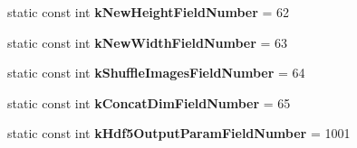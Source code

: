 \begin{DoxyCompactItemize}
\mbox{\label{classcaffe_1_1_v0_layer_parameter_a3b9cf98d26e1eacb3cabf23b320a76fe}} 
static const int {\bfseries k\+New\+Height\+Field\+Number} = 62
\item 
\mbox{\label{classcaffe_1_1_v0_layer_parameter_a8869c8ce79197145fe7b7d7c9a7cbb4d}} 
static const int {\bfseries k\+New\+Width\+Field\+Number} = 63
\item 
\mbox{\label{classcaffe_1_1_v0_layer_parameter_aa8a75a89d321d30abc38c60b6d050083}} 
static const int {\bfseries k\+Shuffle\+Images\+Field\+Number} = 64
\item 
\mbox{\label{classcaffe_1_1_v0_layer_parameter_ab67ae9676382ebfb408e5bc3bb166321}} 
static const int {\bfseries k\+Concat\+Dim\+Field\+Number} = 65
\item 
\mbox{\label{classcaffe_1_1_v0_layer_parameter_a3ba00a180e0d51e81b4f3b9a5b16b5d9}} 
static const int {\bfseries k\+Hdf5\+Output\+Param\+Field\+Number} = 1001
\end{DoxyCompactItemize}
